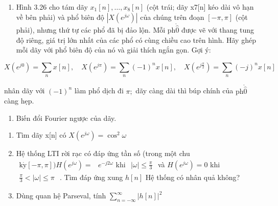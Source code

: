 \documentclass[
  10
]{article}
\providecommand{\tightlist}{%
  \setlength{\itemsep}{0pt}\setlength{\parskip}{0pt}}
\begin{document}
\begin{enumerate}
\def\labelenumi{\arabic{enumi}.}
\setcounter{enumi}{19}
\tightlist
\item
  Hình 3.26 cho tám dãy \(x _ { 1 } [ n ] , \dots , x _ { 8 } [ n ]\)
  (cột trái; dãy x7{[}n{]} kéo dài vô hạn về bên phải) và phổ biên độ
  \(| X ( e ^ { j \omega } ) |\) của chúng trên đoạn \([ - \pi , \pi ]\)
  (cột phải), nhưng thứ tự các phổ đã bị đảo lộn. Mỗi
  \(\mathrm { p h } \mathring { \hat { 0 } }\) được vẽ với thang tung độ
  riêng, giá trị lớn nhất của các phổ có cùng chiều cao trên hình. Hãy
  ghép mỗi dãy với phổ biên độ của nó và giải thích ngắn gọn. Gợi ý:
\end{enumerate}

\[
X (e ^ {j 0}) = \sum_ {n} x [ n ], \quad X (e ^ {j \pi}) = \sum_ {n} (- 1) ^ {n} x [ n ], \quad X (e ^ {j \frac {\pi}{2}}) = \sum_ {n} (- j) ^ {n} x [ n ]
\]

nhân dãy với \(( - 1 ) ^ { n }\) làm phổ dịch đi \(\pi ;\) dãy càng dài
thì búp chính của \(\mathrm { p h } \mathring { \hat { 0 } }\) càng hẹp.

\begin{enumerate}
\def\labelenumi{\arabic{enumi}.}
\setcounter{enumi}{20}
\tightlist
\item
  Biến đổi Fourier ngược của dãy.
\end{enumerate}

\begin{enumerate}
\def\labelenumi{(\alph{enumi})}
\item
  Tìm dãy x{[}n{]} có \(X ( e ^ { j \omega } ) = \cos ^ { 2 } \omega\)
\item
  Hệ thống LTI rời rạc có đáp ứng tần số (trong một chu
  \(\begin{array} { r } { \mathrm { k } \dot { \mathrm { y } } \left[ - \pi , \pi \right] ) H ( e ^ { j \omega } ) = } \end{array}\)
  \(e ^ { - j 2 \omega }\) khi
  \(\begin{array} { r } { | \omega | \le \frac { \pi } { 3 } } \end{array}\)
  và \(H ( e ^ { j \omega } ) = 0\) khi
  \(\begin{array} { r } { \frac { \pi } { 3 } < | \omega | \le \pi } \end{array}\)
  . Tìm đáp ứng xung \(h [ n ]\) Hệ thống có nhân quả không?
\item
  Dùng quan hệ Parseval, tính
  \(\scriptstyle \sum _ { n = - \infty } ^ { \infty } | h [ n ] | ^ { 2 }\)
\end{enumerate}
\end{document}
